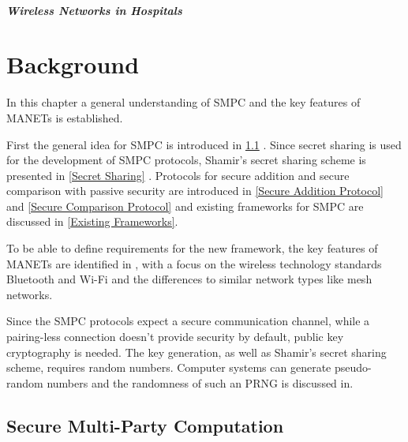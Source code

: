 		\paragraph{Wireless Networks in Hospitals}

\FloatBarrier
\chapter{Background} 
\label{Background}
	
	In this chapter a general understanding of \gls{SMPC} and the key features of \glspl{MANET} is established.  
	
	First the general idea for \gls{SMPC} is introduced in \ref{Secure Multi-Party Computation} . Since secret sharing is used for the development of \gls{SMPC} protocols, Shamir's secret sharing scheme is presented in \ref{Secret Sharing} .
	Protocols for secure addition and secure comparison with passive security are introduced in \ref{Secure Addition Protocol} and \ref{Secure Comparison Protocol} and existing frameworks for \gls{SMPC} are discussed in \ref{Existing Frameworks}.
	
	To be able to define requirements for the new framework, the key features of \glspl{MANET} are identified in , with a focus on the wireless technology standards Bluetooth and Wi-Fi and the differences to similar network types like mesh networks.
	
	Since the \gls{SMPC} protocols expect a secure communication channel, while a pairing-less connection doesn't provide security by default, public key cryptography is needed. The key generation, as well as Shamir's secret sharing scheme, requires random numbers. Computer systems can generate pseudo-random numbers and the randomness of such an \gls{PRNG} is discussed in.
		
	\section{Secure Multi-Party Computation}
	\label{Secure Multi-Party Computation}
	
